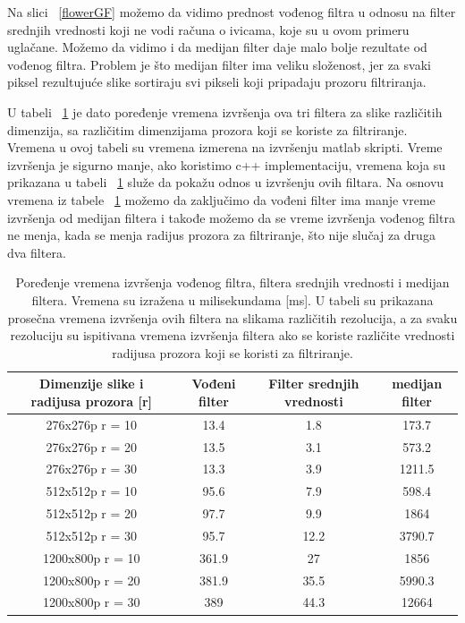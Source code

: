 \documentclass[a4paper,12pt,titlepage]{article}
\begin{document}
Na slici ~\ref{flowerGF} možemo da vidimo prednost vođenog filtra u odnosu na filter srednjih vrednosti koji ne vodi računa o ivicama, koje su u ovom primeru uglačane. Možemo da vidimo i da medijan filter daje malo bolje rezultate od vođenog filtra. Problem je što medijan filter ima veliku složenost, jer za svaki piksel rezultujuće slike sortiraju svi pikseli koji pripadaju prozoru filtriranja.

U tabeli ~\ref{tabela} je dato poređenje vremena izvršenja ova tri filtera za slike različitih dimenzija, sa različitim dimenzijama prozora koji se koriste za filtriranje. Vremena u ovoj tabeli su vremena izmerena na izvršenju matlab skripti. Vreme izvršenja je sigurno manje, ako koristimo c++ implementaciju, vremena koja su prikazana u tabeli ~\ref{tabela} služe da pokažu odnos u izvršenju ovih filtara. Na osnovu vremena iz tabele ~\ref{tabela} možemo da zaključimo da vođeni filter ima manje vreme izvršenja od medijan filtera i takođe možemo da se vreme izvršenja vođenog filtra ne menja, kada se menja radijus prozora za filtriranje, što nije slučaj za druga dva filtera. 

\begin{table}[h!]
\centering
\begin{tabular}{| c | c c c|} 
 \hline
 Dimenzije slike i radijusa prozora [r] & Vođeni filter & Filter srednjih vrednosti & medijan filter\\ [0.5ex] 
 \hline
  276x276p r = 10 & 13.4 & 1.8 & 173.7  \\ 
  276x276p r = 20 & 13.5 & 3.1 & 573.2  \\
  276x276p r = 30 & 13.3 & 3.9 & 1211.5 \\
  512x512p r = 10 & 95.6 & 7.9 & 598.4 \\
  512x512p r = 20 & 97.7 & 9.9 & 1864  \\
  512x512p r = 30 & 95.7 & 12.2 & 3790.7 \\
  1200x800p r = 10 & 361.9 & 27 & 1856 \\
  1200x800p r = 20 & 381.9 & 35.5 & 5990.3 \\
  1200x800p r = 30 & 389 & 44.3 & 12664 \\ [1ex] 
 \hline
\end{tabular}
\caption{Poređenje vremena izvršenja vođenog filtra, filtera srednjih vrednosti i medijan filtera. Vremena su izražena u milisekundama [ms]. U tabeli su prikazana prosečna vremena izvršenja ovih filtera na slikama različitih rezolucija, a za svaku rezoluciju su ispitivana vremena izvršenja  filtera ako se koriste različite vrednosti radijusa prozora koji se koristi za filtriranje. }
\label{tabela}
\end{table}
\end{document}
